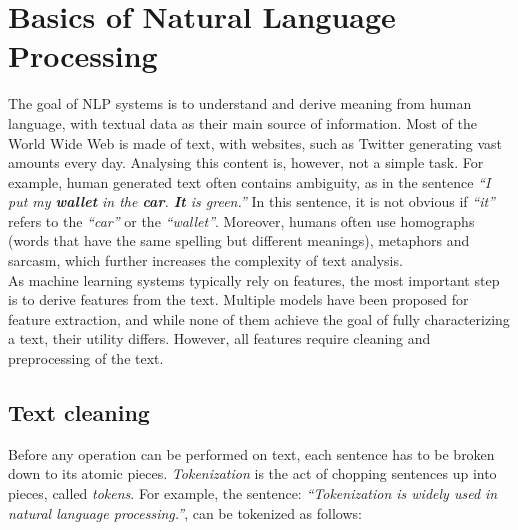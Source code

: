 \section{Basics of Natural Language Processing}\label{sec:NLP}
The goal of NLP systems is to understand and derive meaning from human language, with textual data as their main source of information.
Most of the World Wide Web is made of text, with websites, such as Twitter generating vast amounts every day. Analysing this content is, however, not a simple task. For example, human generated text often contains ambiguity, as in the sentence \emph{``I put my \textbf{wallet} in the  \textbf{car}.  \textbf{It} is green.''} In this sentence, it is not obvious if \emph{``it''} refers to the \emph{``car''} or the  \emph{``wallet''}. Moreover, humans often use homographs (words that have the same spelling but different meanings), metaphors and sarcasm, which further increases the complexity of text analysis.\\
As machine learning systems typically rely on features, the most important step is to derive features from the text. Multiple models have been proposed for feature extraction, and while none of them achieve the goal of fully characterizing a text, their utility differs.
%
However, all features require cleaning and preprocessing of the text. 

\subsection{Text cleaning}\label{subsec:cleaning}
Before any operation can be performed on text, each sentence has to be broken down to its atomic pieces. \emph{Tokenization} is the act of chopping sentences up into pieces, called \emph{tokens}. For example, the sentence: \emph{``Tokenization is widely used in natural language processing.''}, can be tokenized as follows:\\

